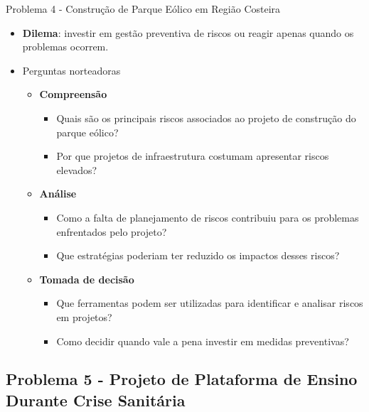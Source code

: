 \documentclass{beamer}
\begin{document}
\begin{frame}{Problema 4 - Construção de Parque Eólico em Região Costeira}
	\begin{itemize}
		\justifying
		\item \textbf{Dilema}: investir em gestão preventiva de riscos ou reagir apenas quando os problemas ocorrem.
		\item Perguntas norteadoras
			\begin{itemize}
				\item \textbf{Compreensão}
					\begin{itemize}
						\justifying
						\item Quais são os principais riscos associados ao projeto de construção do parque eólico?
						\item Por que projetos de infraestrutura costumam apresentar riscos elevados?
					\end{itemize}
				\item \textbf{Análise}
					\begin{itemize}
						\justifying
						\item Como a falta de planejamento de riscos contribuiu para os problemas enfrentados pelo projeto?
						\item Que estratégias poderiam ter reduzido os impactos desses riscos?
					\end{itemize}
				\item \textbf{Tomada de decisão}
					\begin{itemize}
						\justifying
						\item Que ferramentas podem ser utilizadas para identificar e analisar riscos em projetos?
						\item Como decidir quando vale a pena investir em medidas preventivas?
					\end{itemize}
			\end{itemize}
	\end{itemize}
\end{frame}

\subsection{Problema 5 - Projeto de Plataforma de Ensino Durante Crise Sanitária}
\end{document}
